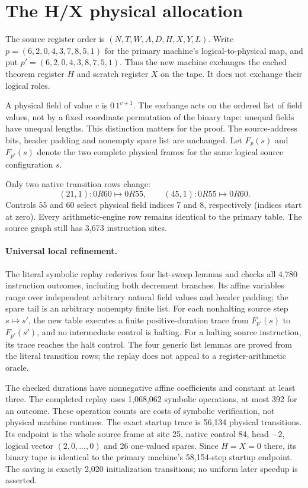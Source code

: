 \section{The H/X physical allocation}

The source register order is $(N,T,W,A,D,H,X,Y,L)$.  Write
$p=(6,2,0,4,3,7,8,5,1)$ for the primary machine's logical-to-physical
map, and put $p'=(6,2,0,4,3,8,7,5,1)$.  Thus the new machine exchanges
the cached theorem register $H$ and scratch register $X$ on the tape.
It does not exchange their logical roles.

A physical field of value $v$ is $0\,1^{v+1}$.  The exchange acts on the
ordered list of field values, not by a fixed coordinate permutation of the
binary tape: unequal fields have unequal lengths.  This distinction matters
for the proof.  The source-address bits, header padding and nonempty spare
list are unchanged.  Let $F_p(s)$ and $F_{p'}(s)$ denote the two complete
physical frames for the same logical source configuration $s$.

Only two native transition rows change:
\[
 (21,1):0R60\longmapsto0R55,\qquad
 (45,1):0R55\longmapsto0R60.
\]
Controls $55$ and $60$ select physical field indices 7 and 8,
respectively (indices start at zero).  Every arithmetic-engine row remains identical to the primary
table.  The source graph still has 3,673 instruction sites.

\paragraph{Universal local refinement.}
The literal symbolic replay rederives four list-sweep lemmas and checks all
4,780 instruction outcomes, including both decrement branches.  Its affine
variables range over independent arbitrary natural field values and header
padding; the spare tail is an arbitrary nonempty finite list.  For each
nonhalting source step $s\longmapsto s'$, the new table executes a finite
positive-duration trace from $F_{p'}(s)$ to $F_{p'}(s')$, and no intermediate
control is halting.  For a halting source instruction, its trace reaches the
halt control.  The four generic list lemmas are proved from the literal
transition rows; the replay does not appeal to a register-arithmetic oracle.

The checked durations have nonnegative affine coefficients and constant at
least three.  The completed replay uses 1,068,062 symbolic operations, at
most 392 for an outcome.  These operation counts are costs of symbolic
verification, not physical machine runtimes.  The exact startup trace is
56,134 physical transitions.  Its endpoint is the whole source frame at
site 25, native control 84, head $-2$, logical vector $(2,0,\ldots,0)$ and
26 one-valued spares.  Since $H=X=0$ there, its binary tape is identical to
the primary machine's 58,154-step startup endpoint.  The saving is exactly
2,020 initialization transitions; no uniform later speedup is asserted.

